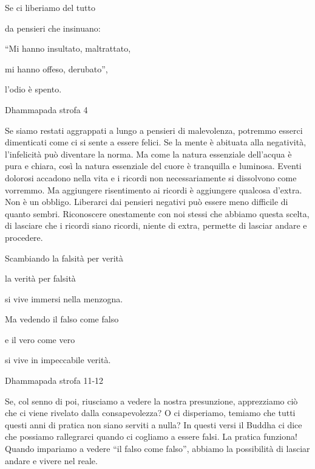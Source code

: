 \documentclass[a4paper,portrait,12pt]{article}
\begin{document}
\newpage



Se ci liberiamo del tutto


da pensieri che insinuano:


``Mi hanno insultato, maltrattato,


mi hanno offeso, derubato'',


l'odio \`{e} spento. 





Dhammapada strofa 4


\newpage



Se siamo restati aggrappati a lungo a pensieri di malevolenza, potremmo esserci dimenticati come ci si sente a essere felici. Se la mente \`{e} abituata alla negativit\`{a}, l'infelicit\`{a} pu\`{o} diventare la norma. Ma come la natura essenziale dell'acqua \`{e} pura e chiara, così la natura essenziale del cuore \`{e} tranquilla e luminosa. Eventi dolorosi accadono nella vita e i ricordi non necessariamente si dissolvono come vorremmo. Ma aggiungere risentimento ai ricordi \`{e} aggiungere qualcosa d'extra. Non \`{e} un obbligo. Liberarci dai pensieri negativi pu\`{o} essere meno difficile di quanto sembri. Riconoscere onestamente con noi stessi che abbiamo questa scelta, di lasciare che i ricordi siano ricordi, niente di extra, permette di lasciar andare e procedere.


\newpage



Scambiando la falsit\`{a} per verit\`{a}


la verit\`{a} per falsit\`{a} 


si vive immersi nella menzogna.





Ma vedendo il falso come falso


e il vero come vero


si vive in impeccabile verit\`{a}.





Dhammapada strofa 11-12


\newpage



Se, col senno di poi, riusciamo a vedere la nostra presunzione, apprezziamo ci\`{o} che ci viene rivelato dalla consapevolezza? O ci disperiamo, temiamo che tutti questi anni di pratica non siano serviti a nulla? In questi versi il Buddha ci dice che possiamo rallegrarci quando ci cogliamo a essere falsi. La pratica funziona! Quando impariamo a vedere ``il falso come falso'', abbiamo la possibilit\`{a} di lasciar andare e vivere nel reale.
\end{document}
